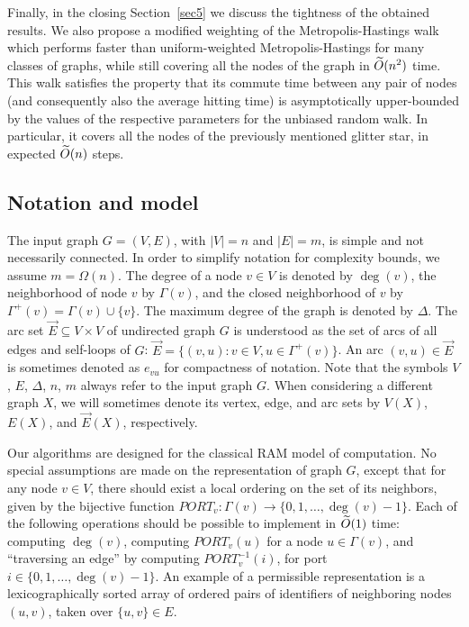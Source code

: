 \documentclass[11pt,a4paper]{article}
\renewcommand{\O}{\ensuremath \widetilde O}
\renewcommand{\*}{\hspace*{5mm}}
\begin{document}
Finally, in the closing Section~\ref{sec5} we discuss the tightness of the obtained results. We also propose a modified weighting of the Metropolis-Hastings walk which performs faster than uniform-weighted Metropolis-Hastings for many classes of graphs, while still covering all the nodes of the graph in $\O(n^2)$ time. This walk satisfies the property that its commute time between any pair of nodes (and consequently also the average hitting time) is asymptotically upper-bounded by the values of the respective parameters for the unbiased random walk. In particular, it covers all the nodes of the previously mentioned glitter star, in expected $\O(n)$ steps.

\subsection{Notation and model}

The input graph $G=(V,E)$, with $|V|=n$ and $|E|=m$, is simple and not necessarily connected. In order to simplify notation for complexity bounds, we assume $m = \Omega(n)$. The degree of a node $v\in V$ is denoted by $\deg(v)$, the neighborhood of node $v$ by $\Gamma(v)$, and  the closed neighborhood of $v$ by $\Gamma^+(v) = \Gamma(v) \cup \{v\}$. The maximum degree of the graph is denoted by $\Delta$. The arc set $\vec E \subseteq V \times V$ of undirected graph $G$ is understood as the set of arcs of all edges and self-loops of $G$: $\vec E = \{(v,u) : v\in V, u \in \Gamma^+(v)\}$. An arc $(v,u)\in \vec E$ is sometimes denoted as $e_{vu}$ for compactness of notation. Note that the symbols $V$, $E$, $\Delta$, $n$, $m$ always refer to the input graph $G$. When considering a different graph $X$, we will sometimes denote its vertex, edge, and arc sets by $V(X)$, $E(X)$, and $\vec E(X)$, respectively. 

Our algorithms are designed for the classical RAM model of computation. No special assumptions are made on the representation of graph $G$, except that for any node $v\in V$, there should exist a local ordering on the set of its neighbors, given by the bijective function $PORT_v : \Gamma(v) \to \{0,1,\ldots,\deg(v)-1\}$. Each of the following operations should be possible to implement in $\O(1)$ time: computing $\deg(v)$, computing $PORT_v(u)$ for a node $u \in \Gamma(v)$, and ``traversing an edge'' by computing $PORT^{-1}_v(i)$, for port $i\in \{0,1,\ldots,\deg(v)-1\}$. An example of a permissible representation is a lexicographically sorted array of ordered pairs of identifiers of neighboring nodes $(u,v)$, taken over $\{u,v\}\in E$.
\end{document}
